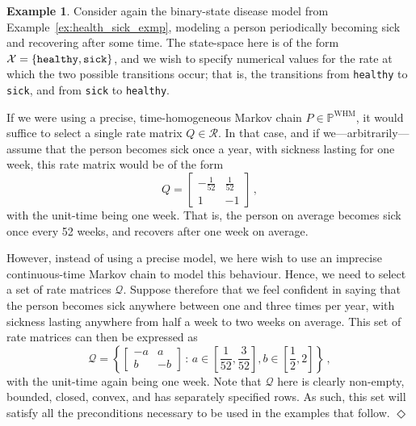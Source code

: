 \documentclass[10pt,a4paper]{paper}
\theoremstyle{definition}
\newtheorem{exmp}{Example}%
\newcommand{\states}{\mathcal{X}}
\newcommand{\processes}{\mathbb{P}}
\newcommand{\whmprocesses}{\processes^{\mathrm{WHM}}}
\newcommand{\rateset}{\mathcal{Q}}
\newcommand{\exampleend}{\hfill$\Diamond$}
\begin{document}

\begin{exmp}\label{exmp:example_rateset_simple_model}
Consider again the binary-state disease model from Example~\ref{ex:health_sick_exmp}, modeling a person periodically becoming sick and recovering after some time. The state-space here is of the form $\states=\{\text{{\tt healthy}},\text{{\tt sick}}\}$, and we wish to specify numerical values for the rate at which the two possible transitions occur; that is, the transitions from {\tt healthy} to {\tt sick}, and from {\tt sick} to {\tt healthy}.

If we were using a precise, time-homogeneous Markov chain $P\in\whmprocesses$, it would suffice to select a single rate matrix $Q\in\mathcal{R}$. In that case, and if we---arbitrarily---assume that the person becomes sick once a year, with sickness lasting for one week, this rate matrix would be of the form
\begin{equation*}
Q = \left[ \begin{array}{rr}
-\frac{1}{52} & \frac{1}{52} \\
1 & -1
\end{array}\right]\,,
\end{equation*}
with the unit-time being one week. That is, the person on average becomes sick once every 52 weeks, and recovers after one week on average.

However, instead of using a precise model, we here wish to use an imprecise continuous-time Markov chain to model this behaviour. Hence, we need to select a set of rate matrices $\rateset$. Suppose therefore that we feel confident in saying that the person becomes sick anywhere between one and three times per year, with sickness lasting anywhere from half a week to two weeks on average. This set of rate matrices can then be expressed as
\begin{equation}\label{eq:num_example_rateset_params}
\rateset = \left\{\left[\begin{array}{rr}
-a & a \\
b & -b
\end{array}\right]\,:\,a\in\left[\frac{1}{52},\frac{3}{52}\right], b\in\left[\frac{1}{2},2\right]\right\}\,,
\end{equation}
with the unit-time again being one week. Note that $\rateset$ here is clearly non-empty, bounded, closed, convex, and has separately specified rows. As such, this set will satisfy all the preconditions necessary to be used in the examples that follow.
\exampleend
\end{exmp}
\end{document}
